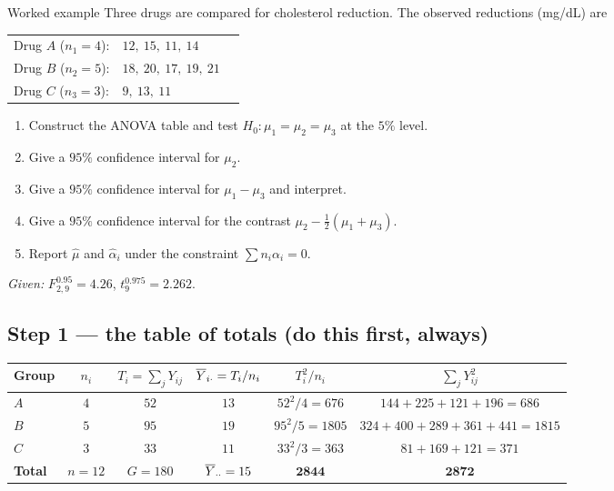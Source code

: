 \documentclass[11pt]{article}
\begin{document}
\begin{exam}{Worked example}
Three drugs are compared for cholesterol reduction. The observed reductions (mg/dL) are

\begin{center}
\begin{tabular}{@{}lll@{}}
\toprule
Drug $A$ ($n_1=4$): & $12,\ 15,\ 11,\ 14$ \\
Drug $B$ ($n_2=5$): & $18,\ 20,\ 17,\ 19,\ 21$ \\
Drug $C$ ($n_3=3$): & $9,\ 13,\ 11$ \\
\bottomrule
\end{tabular}
\end{center}

\begin{enumerate}[label=(\alph*)]
  \item Construct the ANOVA table and test $H_0:\mu_1=\mu_2=\mu_3$ at the $5\%$ level.
  \item Give a $95\%$ confidence interval for $\mu_2$.
  \item Give a $95\%$ confidence interval for $\mu_1-\mu_3$ and interpret.
  \item Give a $95\%$ confidence interval for the contrast $\mu_2-\tfrac12(\mu_1+\mu_3)$.
  \item Report $\hat\mu$ and $\hat\alpha_i$ under the constraint $\sum n_i\alpha_i=0$.
\end{enumerate}
\emph{Given:} $F^{0.95}_{2,9}=4.26$, \quad $t^{0.975}_{9}=2.262$.
\end{exam}

\subsection{Step 1 --- the table of totals (do this first, always)}

\begin{center}
\begin{tabular}{@{}lccccc@{}}
\toprule
Group & $n_i$ & $T_i=\sum_j Y_{ij}$ & $\overline{Y}_{i\cdot}=T_i/n_i$ & $T_i^2/n_i$ & $\sum_j Y_{ij}^2$\\
\midrule
$A$ & $4$ & $52$ & $13$ & $52^2/4=676$ & $144{+}225{+}121{+}196=686$\\
$B$ & $5$ & $95$ & $19$ & $95^2/5=1805$ & $324{+}400{+}289{+}361{+}441=1815$\\
$C$ & $3$ & $33$ & $11$ & $33^2/3=363$ & $81{+}169{+}121=371$\\
\midrule
\textbf{Total} & $n=12$ & $G=180$ & $\overline{Y}_{\cdot\cdot}=15$ & $\mathbf{2844}$ & $\mathbf{2872}$\\
\bottomrule
\end{tabular}
\end{center}
\end{document}
